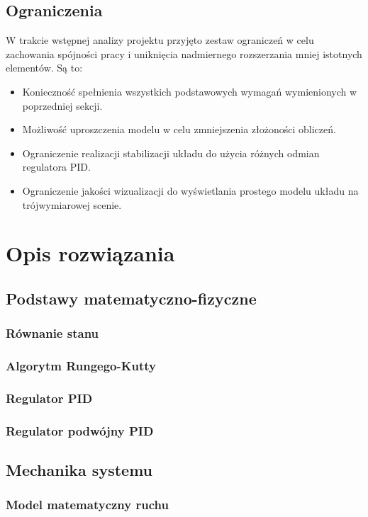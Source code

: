 \documentclass[12pt, oneside]{report}
\theoremstyle{definition}
\begin{document}
\section{Ograniczenia}
W trakcie wstępnej analizy projektu przyjęto zestaw ograniczeń w celu zachowania spójności pracy i uniknięcia nadmiernego rozszerzania mniej istotnych elementów. Są to:
\begin{itemize}
\item Konieczność spełnienia wszystkich podstawowych wymagań wymienionych w poprzedniej sekcji.
\item Możliwość uproszczenia modelu w celu zmniejszenia złożoności obliczeń.
\item Ograniczenie realizacji stabilizacji układu do użycia różnych odmian regulatora PID.
\item Ograniczenie jakości wizualizacji do wyświetlania prostego modelu układu na trójwymiarowej scenie.
\end{itemize}

\newpage
\chapter{Opis rozwiązania}
\section{Podstawy matematyczno-fizyczne}
\subsection{Równanie stanu}
\subsection{Algorytm Rungego-Kutty}
\subsection{Regulator PID}
\subsection{Regulator podwójny PID}
\section{Mechanika systemu}
\subsection{Model matematyczny ruchu}
\end{document}
